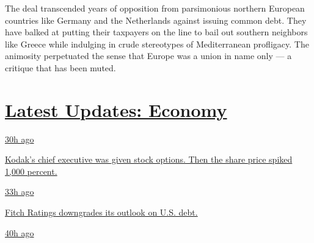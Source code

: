 The deal transcended years of opposition from parsimonious northern
European countries like Germany and the Netherlands against issuing
common debt. They have balked at putting their taxpayers on the line to
bail out southern neighbors like Greece while indulging in crude
stereotypes of Mediterranean profligacy. The animosity perpetuated the
sense that Europe was a union in name only --- a critique that has been
muted.

\hypertarget{latest-updates-economy}{%
\section{\texorpdfstring{\href{https://www.nytimes.com/live/2020/07/31/business/stock-market-today-coronavirus?action=click\&pgtype=Article\&state=default\&region=MAIN_CONTENT_1\&context=storylines_live_updates}{Latest
Updates:
Economy}}{Latest Updates: Economy}}\label{latest-updates-economy}}

\href{https://www.nytimes.com/live/2020/07/31/business/stock-market-today-coronavirus?action=click\&pgtype=Article\&state=default\&region=MAIN_CONTENT_1\&context=storylines_live_updates\#kodaks-chief-executive-was-given-stock-options-then-the-share-price-spiked-1000-percent}{30h
ago}

\href{https://www.nytimes.com/live/2020/07/31/business/stock-market-today-coronavirus?action=click\&pgtype=Article\&state=default\&region=MAIN_CONTENT_1\&context=storylines_live_updates\#kodaks-chief-executive-was-given-stock-options-then-the-share-price-spiked-1000-percent}{Kodak's
chief executive was given stock options. Then the share price spiked
1,000 percent.}

\href{https://www.nytimes.com/live/2020/07/31/business/stock-market-today-coronavirus?action=click\&pgtype=Article\&state=default\&region=MAIN_CONTENT_1\&context=storylines_live_updates\#fitch-ratings-downgrades-its-outlook-on-us-debt}{33h
ago}

\href{https://www.nytimes.com/live/2020/07/31/business/stock-market-today-coronavirus?action=click\&pgtype=Article\&state=default\&region=MAIN_CONTENT_1\&context=storylines_live_updates\#fitch-ratings-downgrades-its-outlook-on-us-debt}{Fitch
Ratings downgrades its outlook on U.S. debt.}

\href{https://www.nytimes.com/live/2020/07/31/business/stock-market-today-coronavirus?action=click\&pgtype=Article\&state=default\&region=MAIN_CONTENT_1\&context=storylines_live_updates\#us-sanctions-more-chinese-officials-over-human-rights-violations-as-tensions-flare}{40h
ago}

